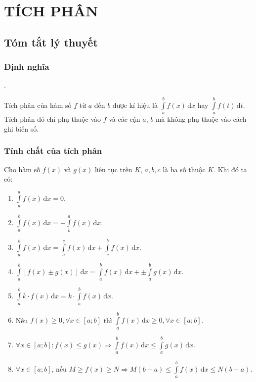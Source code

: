 \section{TÍCH PHÂN}
\subsection{Tóm tắt lý thuyết}
\begin{tomtat} 
	\subsubsection{Định nghĩa}%

\begin{center}
	.
\end{center}
\begin{nx}
	Tích phân của hàm số $f$ từ $a$ đến $b$  được kí hiệu là $\displaystyle\int\limits_a^bf(x)\mathrm{\,d}x$ hay $\displaystyle\int\limits_a^bf(t)\mathrm{\,d}t$.  Tích phân
	đó chỉ phụ thuộc vào $f$ và các cận $a$, $b$ mà không phụ thuộc vào cách ghi biến số. 
\end{nx}
\subsubsection{Tính chất của tích phân}
Cho hàm số $f(x)$ và $g(x)$ liên tục trên $K$, $a,b,c$ là ba số thuộc $K$. Khi đó ta có:
\begin{enumerate}
	\item $\displaystyle\int\limits_a^af(x)\mathrm{\,d}x = 0$.
	\item $\displaystyle\int\limits_a^bf(x)\mathrm{\,d}x = -\displaystyle\int\limits_b^af(x)\mathrm{\,d}x$.
	\item $\displaystyle\int\limits_a^bf(x)\mathrm{\,d}x = \displaystyle\int\limits_a^cf(x)\mathrm{\,d}x + \displaystyle\int\limits_c^bf(x)\mathrm{\,d}x$.
	\item $\displaystyle\int\limits_a^b\left[ f(x) \pm g(x) \right] \mathrm{\,d}x = \displaystyle\int\limits_a^bf(x)\mathrm{\,d}x + \pm \displaystyle\int\limits_a^bg(x)\mathrm{\,d}x $.
	\item $\displaystyle\int\limits_a^bk\cdot f(x)\mathrm{\,d}x = k\cdot \displaystyle\int\limits_a^bf(x)\mathrm{\,d}x$.
	\item Nếu $f(x) \ge 0, \forall x \in [a; b]$ thì $\displaystyle\int\limits_a^bf(x)\mathrm{\,d}x \ge 0, \forall x \in [a; b]$.
	\item $\forall x \in [a;b]: f(x) \le g(x) \Rightarrow \displaystyle\int\limits_a^bf(x)\mathrm{\,d}x \le \displaystyle\int\limits_a^bg(x)\mathrm{\,d}x$.
	\item $\forall x \in [a;b]$, nếu $M \ge f(x) \ge N \Rightarrow M(b - a) \le \displaystyle\int\limits_a^bf(x)\mathrm{\,d}x \le N(b - a)$.
\end{enumerate}
\end{tomtat}
